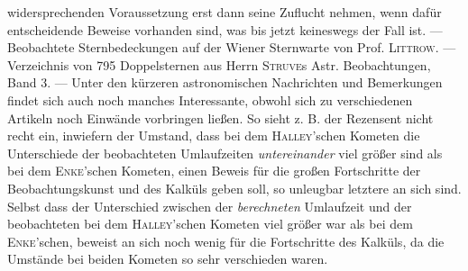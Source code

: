 widersprechenden Voraussetzung erst dann seine Zuflucht nehmen, wenn dafür entscheidende Beweise vorhanden sind, was bis jetzt keineswegs der Fall ist. --- Beobachtete Sternbedeckungen auf der Wiener Sternwarte von Prof. \textsc{Littrow}. --- Verzeichnis von 795 Doppelsternen aus Herrn \textsc{Struve}s Astr. Beobachtungen, Band 3. --- Unter den kürzeren astronomischen Nachrichten und Bemerkungen findet sich auch noch manches Interessante, obwohl sich zu verschiedenen Artikeln noch Einwände vorbringen ließen. So sieht z. B. der Rezensent nicht recht ein, inwiefern der Umstand, dass bei dem \textsc{Halley}'schen Kometen die Unterschiede der beobachteten Umlaufzeiten \emph{untereinander} viel größer sind als bei dem \textsc{Enke}'schen Kometen, einen Beweis für die großen Fortschritte der Beobachtungskunst und des Kalküls geben soll, so unleugbar letztere an sich sind. Selbst dass der Unterschied zwischen der \emph{berechneten} Umlaufzeit und der beobachteten bei dem \textsc{Halley}'schen Kometen viel größer war als bei dem \textsc{Enke}'schen, beweist an sich noch wenig für die Fortschritte des Kalküls, da die Umstände bei beiden Kometen so sehr verschieden waren.
